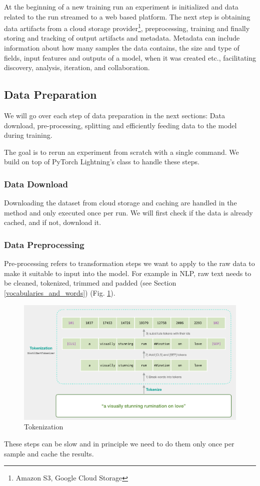 At the beginning of a new training run an experiment is initialized and data related to the run streamed to a web based platform.
The next step is obtaining data artifacts from a cloud storage provider\footnote{Amazon S3, Google Cloud Storage}, preprocessing, training and finally storing and tracking of output artifacts and metadata.
Metadata can include information about how many samples the data contains, the size and type of fields, input features and outputs of a model, when it was created etc., facilitating discovery, analysis, iteration, and collaboration.

\subsection{Data Preparation}
We will go over each step of data preparation in the next sections: Data download, pre-processing, splitting and efficiently feeding data to the model during training.

The goal is to rerun an experiment from scratch with a single command.
We build on top of PyTorch Lightning's  class to handle these steps.

\subsubsection{Data Download}
Downloading the dataset from cloud storage and caching are handled in the  method and only executed once per run.
We will first check if the data is already cached, and if not, download it.

\subsubsection{Data Preprocessing}
Pre-processing refers to transformation steps we want to apply to the raw data to make it suitable to input into the model.
For example in NLP, raw text needs to be cleaned, tokenized, trimmed and padded (see Section \ref{vocabularies_and_words}) (Fig. \ref{fig:tokenization}).
\begin{figure}
    \includegraphics[width=\linewidth]{chapters/NLP/figures/tokenization.png}
    \caption{Tokenization}
    \label{fig:tokenization}
\end{figure}
These steps can be slow and in principle we need to do them only once per sample and cache the results.

